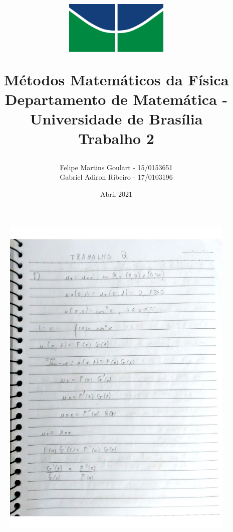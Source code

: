 \documentclass[a4paper]{article}
\title{%
\begin{figure}[htp]
    \centering
    \includegraphics[width=5cm]{logo_unb.png}
\end{figure}

Métodos Matemáticos da Física \\
  \large Departamento de Matemática - Universidade de Brasília\\
  \Large Trabalho 2}
\author{
    Felipe Martins Goulart - 15/0153651 \\
    Gabriel Adiron Ribeiro - 17/0103196 \\
}
\date{Abril 2021}
\begin{document}
    \maketitle
    \renewcommand{\theenumi}{\alph{}}
    \section {}
        \begin{figure}{\textwidth}
            \centering
            \includegraphics[width=\textwidth]{Questoes-1-3_page-0001.jpg}
        \end{figure}
\end{document}

